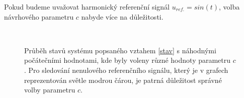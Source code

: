 \documentclass{article}
\begin{document}
\par Pokud budeme uvažovat harmonický referenční signál $u_{ref.}=sin(t)$, volba návrhového parametru $c$ nabyde více na důležitosti.
\begin{figure}[H]%
    \centering
    \quad
\\
%
 \quad
    \caption{Průběh stavů systému popsaného vztahem \eqref{stav} s náhodnými počátečními hodnotami, kde byly voleny různé hodnoty parametru $c$. Pro sledování nenulového referenčního signálu, který je v grafech reprezentován světle modrou čárou, je patrná důležitost správné volby parametru $c$.}
\label{ex1u}
\end{figure}
\end{document}

